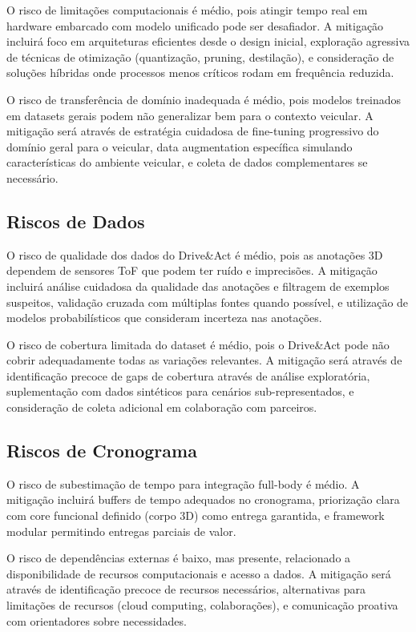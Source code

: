 \documentclass[12pt, a4paper]{article}
\begin{document}
O risco de limitações computacionais é médio, pois atingir tempo real em hardware embarcado com modelo unificado pode ser desafiador. A mitigação incluirá foco em arquiteturas eficientes desde o design inicial, exploração agressiva de técnicas de otimização (quantização, pruning, destilação), e consideração de soluções híbridas onde processos menos críticos rodam em frequência reduzida.

O risco de transferência de domínio inadequada é médio, pois modelos treinados em datasets gerais podem não generalizar bem para o contexto veicular. A mitigação será através de estratégia cuidadosa de fine-tuning progressivo do domínio geral para o veicular, data augmentation específica simulando características do ambiente veicular, e coleta de dados complementares se necessário.

\subsection{Riscos de Dados}

O risco de qualidade dos dados do Drive\&Act é médio, pois as anotações 3D dependem de sensores ToF que podem ter ruído e imprecisões. A mitigação incluirá análise cuidadosa da qualidade das anotações e filtragem de exemplos suspeitos, validação cruzada com múltiplas fontes quando possível, e utilização de modelos probabilísticos que consideram incerteza nas anotações.

O risco de cobertura limitada do dataset é médio, pois o Drive\&Act pode não cobrir adequadamente todas as variações relevantes. A mitigação será através de identificação precoce de gaps de cobertura através de análise exploratória, suplementação com dados sintéticos para cenários sub-representados, e consideração de coleta adicional em colaboração com parceiros.

\subsection{Riscos de Cronograma}

O risco de subestimação de tempo para integração full-body é médio. A mitigação incluirá buffers de tempo adequados no cronograma, priorização clara com core funcional definido (corpo 3D) como entrega garantida, e framework modular permitindo entregas parciais de valor.

O risco de dependências externas é baixo, mas presente, relacionado a disponibilidade de recursos computacionais e acesso a dados. A mitigação será através de identificação precoce de recursos necessários, alternativas para limitações de recursos (cloud computing, colaborações), e comunicação proativa com orientadores sobre necessidades.
\end{document}
